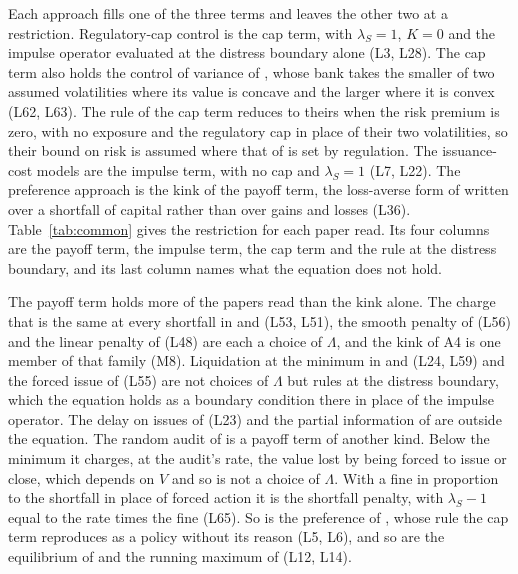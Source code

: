 Each approach fills one of the three terms and leaves the other two at a
restriction. Regulatory-cap control is the cap term, with $\lambda_S=1$, $K=0$
and the impulse operator evaluated at the distress boundary alone (L3, L28).
The cap term also holds the control of variance of \citet{milnewhalley2001},
whose bank takes the smaller of two assumed volatilities where its value is
concave and the larger where it is convex (L62, L63). The rule of the cap
term reduces to theirs when the risk premium is zero, with no exposure and the
regulatory cap in place of their two volatilities, so their bound on risk is
assumed where that of \citet{bayraktar2026} is set by regulation.
The issuance-cost models are the impulse term, with no cap and $\lambda_S=1$
(L7, L22). The preference approach is the kink of the payoff term, the
loss-averse form of \citet{barberis2001} written over a shortfall of capital
rather than over gains and losses (L36). Table~\ref{tab:common} gives the
restriction for each paper read. Its four columns are the payoff term, the
impulse term, the cap term and the rule at the distress boundary, and its last
column names what the equation does not hold.

The payoff term holds more of the papers read than the kink alone. The charge
that is the same at every shortfall in \citet{behn2019} and
\citet{langmenno2026} (L53, L51), the smooth penalty of \citet{lambertini2014}
(L56) and the linear penalty of \citet{constantinides1978} (L48) are each a
choice of $\Lambda$, and the kink of A4 is one member of that family (M8).
Liquidation at the minimum in \citet{peura2006} and \citet{federico2026} (L24,
L59) and the forced issue of \citet{glover2023} (L55) are not choices of
$\Lambda$ but rules at the distress boundary, which the equation holds as a
boundary condition there in place of the impulse operator. The delay on issues
of \citet{peura2006} (L23) and the partial information of
\citet{daihuangkeppo2019} are outside the equation. The random audit of
\citet{milnewhalley2001} is a payoff term of another kind. Below the minimum
it charges, at the audit's rate, the value lost by being forced to issue or
close, which depends on $V$ and so is not a choice of $\Lambda$. With a fine
in proportion to the shortfall in place of forced action it is the shortfall
penalty, with $\lambda_S-1$ equal to the rate times the fine (L65). So is the preference of
\citet{blackperold1992}, whose rule the cap term reproduces as a policy
without its reason (L5, L6), and so are the equilibrium of
\citet{barberis2001} and the running maximum of \citet{li2023} (L12, L14).

